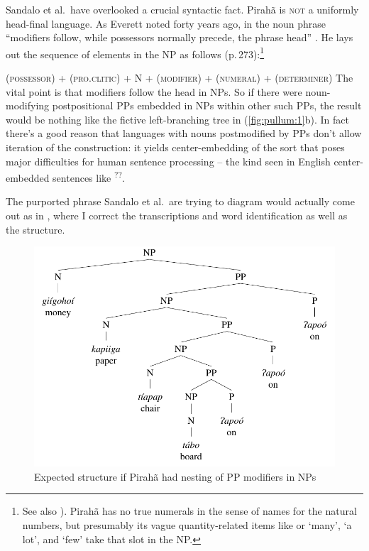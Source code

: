 \documentclass[output=paper,colorlinks,citecolor=brown
]{langscibook}
\begin{document}
Sandalo et al.\ have overlooked a crucial syntactic fact. Pirah{\~a} is
\textsc{not} a uniformly head-final language. As Everett noted forty
years ago, in the noun phrase ``modifiers follow, while possessors normally
precede, the phrase head'' \citep[272]{Everett86HAL}. He lays out
the sequence of elements in the NP as follows (p.\,273):\footnote{%
   See also ). Pirah{\~a} has no true
   numerals in the sense of names for the natural numbers, but presumably
   its vague quantity-related items like  or
    `many',
    `a lot', and
    `few' take that slot in the NP.}

\ea
(\textsc{possessor}) + (\textsc{pro.clitic}) + N + (\textsc{modifier})
+ (\textsc{numeral}) + (\textsc{determiner})
\label{ex:pullum:6}
\z
\medskip\noindent
The vital point is that modifiers follow the head in NPs. So if there
were noun-modifying postpositional PPs embedded in NPs within other
such PPs, the result would be nothing like the fictive left-branching
tree in (\ref{fig:pullum:1}b). In fact there's a good reason that languages with nouns
postmodified by PPs don't allow iteration of the construction: it
yields center-embedding of the sort that poses major difficulties for
human sentence processing -- the kind seen in English center-embedded
sentences like \textsuperscript{??}.

The purported phrase Sandalo et al.\ are trying to diagram would
actually come out as in , where I correct the transcriptions
and word identification as well as the structure.

\begin{figure}
\includegraphics[width=\textwidth]{figures/pullum_figure3.pdf}
\caption{Expected structure if Pirah{\~a} had nesting of PP modifiers in NPs}
\label{fig:pullum:2}
\end{figure}
\end{document}
